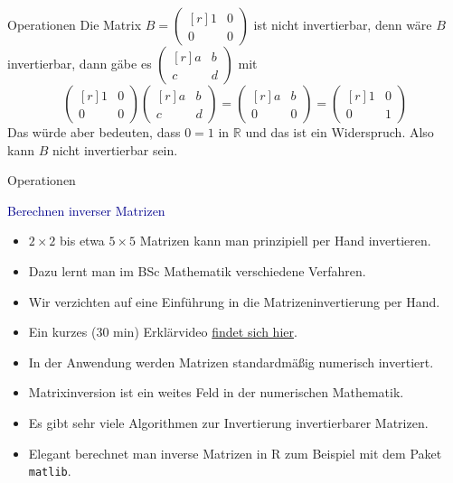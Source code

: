 \documentclass[
  8pt,
  ignorenonframetext,
]{beamer}
\providecommand{\tightlist}{%
  \setlength{\itemsep}{0pt}\setlength{\parskip}{0pt}}
\begin{document}
\begin{frame}{Operationen}
Die Matrix \(B = \begin{pmatrix*}[r] 1 & 0 \\ 0 & 0 \end{pmatrix*}\) ist
nicht invertierbar, denn wäre \(B\) invertierbar, dann gäbe es
\(\begin{pmatrix*}[r] a & b \\ c & d \end{pmatrix*}\) mit
\begin{equation}
\begin{pmatrix*}[r] 1 & 0 \\ 0 & 0 \end{pmatrix*}
\begin{pmatrix*}[r] a & b \\ c & d \end{pmatrix*}
=
\begin{pmatrix*}[r] a & b \\ 0 & 0 \end{pmatrix*}
=
\begin{pmatrix*}[r] 1 & 0 \\ 0 & 1 \end{pmatrix*}
\end{equation} Das würde aber bedeuten, dass \(0 = 1\) in \(\mathbb{R}\)
und das ist ein Widerspruch. Also kann \(B\) nicht invertierbar sein.
\end{frame}

\begin{frame}[fragile]{Operationen}
\protect\hypertarget{operationen-26}{}

\textcolor{darkblue}{Berechnen inverser Matrizen}

\small

\begin{itemize}
\tightlist
\item
  \(2 \times 2\) bis etwa \(5 \times 5\) Matrizen kann man prinzipiell
  per Hand invertieren.
\item
  Dazu lernt man im BSc Mathematik verschiedene Verfahren.
\item
  Wir verzichten auf eine Einführung in die Matrizeninvertierung per
  Hand.
\item
  Ein kurzes (30 min) Erklärvideo
  \href{https://www.youtube.com/watch?v=9TD6gXfQDkw\&t=7s}{findet sich
  hier}.
\item
  In der Anwendung werden Matrizen standardmäßig numerisch invertiert.
\item
  Matrixinversion ist ein weites Feld in der numerischen Mathematik.
\item
  Es gibt sehr viele Algorithmen zur Invertierung invertierbarer
  Matrizen.
\item
  Elegant berechnet man inverse Matrizen in R zum Beispiel mit dem Paket
  \texttt{matlib}.
\end{itemize}
\end{frame}
\end{document}
